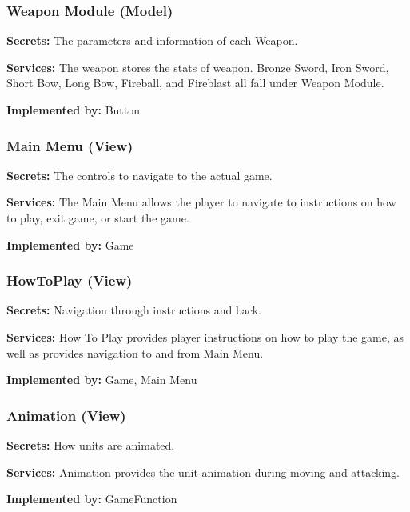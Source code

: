\documentclass{article}
\begin{document}
\subsubsection{Weapon Module (Model)}
\begin{description}[leftmargin=0.2cm]
    \item \textbf{Secrets:} The parameters and information of each Weapon.
    \item \textbf{Services:} The weapon stores the stats of weapon. Bronze Sword, Iron Sword, Short Bow, Long Bow, Fireball, and Fireblast all fall under Weapon Module.
    \item \textbf{Implemented by:} Button
\end{description}

\subsubsection{Main Menu (View)}
\begin{description}[leftmargin=0.2cm]
    \item \textbf{Secrets:} The controls to navigate to the actual game.
    \item \textbf{Services:} The Main Menu allows the player to navigate to instructions on how to play, exit game, or start the game.
    \item \textbf{Implemented by:} Game
\end{description}

\subsubsection{HowToPlay (View)}
\begin{description}[leftmargin=0.2cm]
    \item \textbf{Secrets:} Navigation through instructions and back.
    \item \textbf{Services:} How To Play provides player instructions on how to play the game, as well as provides navigation to and from Main Menu.
    \item \textbf{Implemented by:} Game, Main Menu
\end{description}

\subsubsection{Animation (View)}
\begin{description}[leftmargin=0.2cm]
    \item \textbf{Secrets:} How units are animated.
    \item \textbf{Services:} Animation provides the unit animation during moving and attacking.
    \item \textbf{Implemented by:} GameFunction
\end{description}
\end{document}

